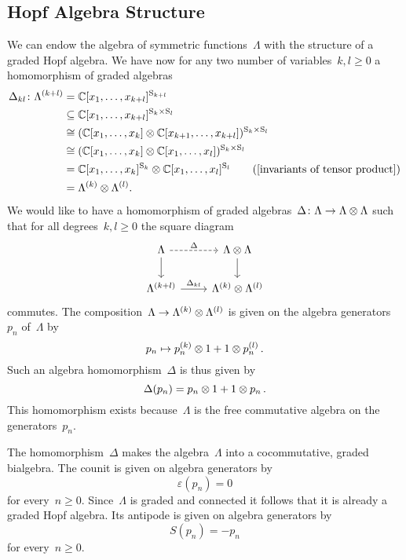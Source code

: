 \documentclass[a4paper,11pt]{scrartcl}
\begin{document}
\subsection{Hopf Algebra Structure}

We can endow the algebra of symmetric functions~$\Lambda$ with the structure of a graded Hopf algebra.
We have now for any two number of variables~$k, l \geq 0$ a homomorphism of graded algebras
\begin{align*}
  \Delta_{kl}
  \colon
  \Lambda^{(k+l)}
  &=
  \Complex[x_1, \dotsc, x_{k+l}]^{\symm_{k+l}}
  \\
  &\subseteq
  \Complex[x_1, \dotsc, x_{k+l}]^{\symm_k \times \symm_l}
  \\
  &\cong
  ( \Complex[x_1, \dotsc, x_k] \tensor \Complex[x_{k+1}, \dotsc, x_{k+l}] )^{\symm_k \times \symm_l}
  \\
  &\cong
  ( \Complex[x_1, \dotsc, x_k] \tensor \Complex[x_1, \dotsc, x_l] )^{\symm_k \times \symm_l}
  \\
  &=
  \Complex[x_1, \dotsc, x_k]^{\symm_k} \tensor \Complex[x_1, \dotsc, x_l]^{\symm_l}
  \tag{\cref{invariants of tensor product}}
  \\
  &=
  \Lambda^{(k)} \tensor \Lambda^{(l)}.
\end{align*}
We would like to have a homomorphism of graded algebras~$\Delta \colon \Lambda \to \Lambda \otimes \Lambda$ such that for all degrees~$k, l \geq 0$ the square diagram
\[
  \begin{tikzcd}
    \Lambda
    \arrow[dashed]{r}[above]{\Delta}
    \arrow{d}
    &
    \Lambda \tensor \Lambda
    \arrow{d}
    \\
    \Lambda^{(k+l)}
    \arrow{r}[above]{\Delta_{kl}}
    &
    \Lambda^{(k)} \tensor \Lambda^{(l)}
  \end{tikzcd}
\]
commutes.
The composition~$\Lambda \to \Lambda^{(k)} \otimes \Lambda^{(l)}$ is given on the algebra generators~$p_n$ of~$\Lambda$ by
\[
  p_n \mapsto p^{(k)}_n \otimes 1 + 1 \otimes p^{(l)}_n \,.
\]
Such an algebra homomorphism~$\Delta$ is thus given by
\[
  \Delta(p_n) = p_n \otimes 1 + 1 \otimes p_n \,.
\]
This homomorphism exists because~$\Lambda$ is the free commutative algebra on the generators~$p_n$.

The homomorphism~$\Delta$ makes the algebra~$\Lambda$ into a cocommutative, graded bialgebra.
The counit is given on algebra generators by
\[
  \varepsilon(p_n) = 0
\]
for every~$n \geq 0$.
Since~$\Lambda$ is graded and connected it follows that it is already a graded Hopf algebra.
Its antipode is given on algebra generators by
\[
  S(p_n) = -p_n
\]
for every~$n \geq 0$.
\end{document}
